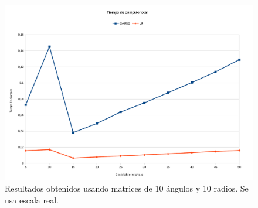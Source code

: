 \begin{figure}[H]{}
\centering
\includegraphics[scale=0.5]{graphs/gaussVsLU3.pdf}
\caption{Resultados obtenidos usando matrices de 10 ángulos y 10 radios. Se usa escala real.}
\label{gaussVsLU3}


\end{figure}
